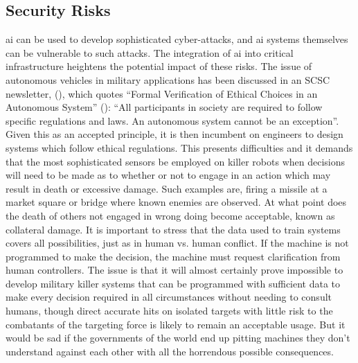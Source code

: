 \subsection{Security Risks}
\gls{ai} can be used to develop sophisticated cyber-attacks, and \gls{ai} systems themselves can be vulnerable to such attacks. The integration of \gls{ai} into critical infrastructure heightens the potential impact of these risks. The issue of autonomous vehicles in military applications has been discussed in an SCSC newsletter, (\cite{citation:SCSC152}), which quotes ``Formal Verification of Ethical Choices in an Autonomous System'' (\cite{citation:Dennis2015}): ``All participants in society are required to follow specific regulations and laws. An autonomous system cannot be an exception''. Given this as an accepted  principle, it is then incumbent on engineers to design systems which follow ethical regulations. This presents difficulties and it demands that the most sophisticated sensors be employed on killer robots when decisions will need to be made as to whether or not to engage in an action which may result in death or excessive damage. Such examples are, firing a missile at a market square or bridge where known enemies are observed. At what point does the death of others not engaged in wrong doing become acceptable, known as collateral damage. It is important to stress that  the data used to train systems covers all possibilities, just as in human vs.  human conflict. If the machine is not programmed to make the decision, the machine must request clarification from human controllers. The issue is that it will almost certainly prove impossible to develop military killer systems that can be programmed with sufficient data to make every decision required in all circumstances without needing to consult humans, though direct accurate hits on isolated targets with little risk to the combatants of the targeting force is likely to remain an acceptable usage. But it would be sad if the governments of the world end up pitting machines they don’t understand against each other with all the horrendous possible consequences.

